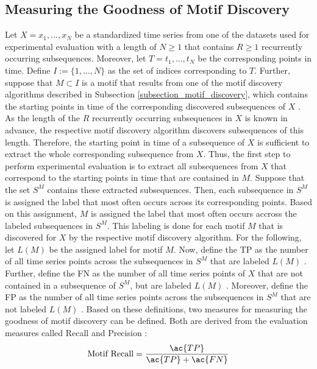 \subsection*{Measuring the Goodness of Motif Discovery}
Let $X = x_1, ..., x_N$ be a standardized time series from one of the datasets used for experimental evaluation with a length of $N \geq 1$ that contains $R \geq 1$ recurrently occurring subsequences. Moreover, let $T = t_1, ..., t_N$ be the corresponding points in time. Define $I := \{1, ..., N\}$ as the set of indices corresponding to $T$. Further, suppose that $M \subset I$ is a motif that results from one of the motif discovery algorithms described in Subsection \ref{subsection_motif_discovery}, which contains the starting points in time of the corresponding discovered subsequences of $X$ \cite{Diss_VW}. As the length of the $R$ recurrently occurring subsequences in $X$ is known in advance, the respective motif discovery algorithm discovers subsequences of this length. Therefore, the starting point in time of a subsequence of $X$ is sufficient to extract the whole corresponding subsequence from $X$. \newline
Thus, the first step to perform experimental evaluation is to extract all subsequences from $X$ that correspond to the starting points in time that are contained in $M$. Suppose that the set $S^M$ contains these extracted subsequences. Then, each subsequence in $S^M$ is assigned the label that most often occurs across its corresponding points. Based on this assignment, $M$ is assigned the label that most often occurs accross the labeled subsequences in $S^M$. This labeling is done for each motif $M$ that is discovered for $X$ by the respective motif discovery algorithm. For the following, let $L(M)$ be the assigned label for motif $M$. \newline
Now, define the \ac{TP} as the number of all time series points across the subsequences in $S^M$ that are labeled $L(M)$ \cite{Diss_VW}. Further, define the \ac{FN} as the number of all time series points of $X$ that are not contained in a subsequence of $S^M$, but are labeled $L(M)$ \cite{Diss_VW}. Moreover, define the \ac{FP} as the number of all time series points across the subsequences in $S^M$ that are not labeled $L(M)$ \cite{Diss_VW}. Based on these definitions, two measures for measuring the goodness of motif discovery can be defined. Both are derived from the evaluation measures called Recall and Precision \cite{Recall_Precision}:
\begin{equation}
\text{Motif Recall} = \frac{\ac{TP}}{\ac{TP} + \ac{FN}}
\label{eq:motif_recall}
\end{equation}
